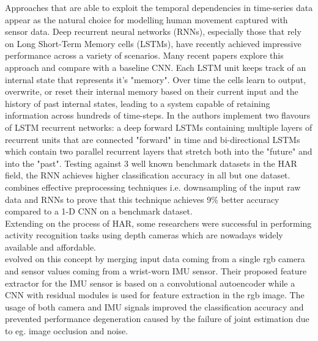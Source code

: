Approaches that are able to exploit the temporal dependencies in time-series data appear as the natural choice for modelling human movement captured with sensor data. Deep recurrent neural networks (RNNs), especially those that rely on Long Short-Term Memory cells (LSTMs), have recently achieved impressive performance across a variety of scenarios. Many recent papers explore this approach and compare with a baseline CNN. Each LSTM unit keeps track of an internal state that represents it's "memory". Over time the cells learn to output, overwrite, or reset their internal memory based on their current input and the history of past internal states, leading to a system capable of retaining information across hundreds of time-steps. In \cite{nils-2016} the authors implement two flavours of LSTM recurrent networks: a deep forward LSTMs containing multiple layers of recurrent units that are connected "forward" in time and bi-directional LSTMs which contain two parallel recurrent layers that stretch both into the "future" and into the "past". Testing against 3 well known benchmark datasets in the HAR field, the RNN achieves higher classification accuracy in all but one dataset.\\
\cite{Valarezo-2017} combines effective preprocessing techniques i.e. downsampling of the input raw data and RNNs to prove that this technique achieves 9\% better accuracy compared to a 1-D CNN on a benchmark dataset.\\
Extending on the process of HAR, some researchers were successful in performing activity recognition tasks using depth cameras \cite{su-2016, alessandro-2016} which are nowadays widely available and affordable.\\
\cite{2017-mfi-actionrecognition} evolved on this concept by merging input data coming from a single rgb camera and sensor values coming from a wrist-worn IMU sensor. Their proposed feature extractor for the IMU sensor is based on a convolutional autoencoder while a CNN with residual modules is used for feature extraction in the rgb image. The usage of both camera and IMU signals improved the classification accuracy and prevented performance degeneration caused by the failure of joint estimation due to eg. image occlusion and noise.